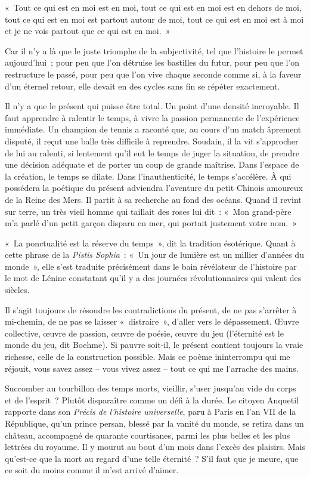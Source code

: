 \documentclass[french,twoside]{book} %
\newenvironment{quoteblock}%
  {\begin{quoting}}
  {\end{quoting}}
\newenvironment{quotebar}{%
    \def\FrameCommand{{\color{rubric!10!}\vrule width 0.5em} \hspace{0.9em}}%
    \def\OuterFrameSep{\itemsep} %
    \MakeFramed {\advance\hsize-\width \FrameRestore}
  }%
  {%
    \endMakeFramed
  }
\renewenvironment{quoteblock}%
  {%
    \savenotes
    \setstretch{0.9}
    \normalfont
    \begin{quotebar}
  }
  {%
    \end{quotebar}
    \spewnotes
  }
\begin{document}
\begin{quoteblock}
\noindent « Tout ce qui est en moi est en moi, tout ce qui est en moi est en dehors de moi, tout ce qui est en moi est partout autour de moi, tout ce qui est en moi est à moi et je ne vois partout que ce qui est en moi. »\end{quoteblock}

\noindent  Car il n’y a là que le juste triomphe de la subjectivité, tel que l’histoire le permet aujourd’hui ; pour peu que l’on détruise les bastilles du futur, pour peu que l’on restructure le passé, pour peu que l’on vive chaque seconde comme si, à la faveur d’un éternel retour, elle devait en des cycles sans fin se répéter exactement.\par
Il n’y a que le présent qui puisse être total. Un point d’une densité incroyable. Il faut apprendre à ralentir le temps, à vivre la passion permanente de l’expérience immédiate. Un champion de tennis a raconté que, au cours d’un match âprement disputé, il reçut une balle très difficile à reprendre. Soudain, il la vit s’approcher de lui au ralenti, si lentement qu’il eut le temps de juger la situation, de prendre une décision adéquate et de porter un coup de grande maîtrise. Dans l’espace de la création, le temps se dilate. Dans l’inauthenticité, le temps s’accélère. À qui possédera la poétique du présent adviendra l’aventure du petit Chinois amoureux de la Reine des Mers. Il partit à sa recherche au fond des océans. Quand il revint sur terre, un très vieil homme qui taillait des roses lui dit : « Mon grand-père m’a parlé d’un petit garçon disparu en mer, qui portait justement votre nom. »\par
« La ponctualité est la réserve du temps », dit la tradition ésotérique. Quant à cette phrase de la \emph{Pistis Sophia} : « Un jour de lumière est un millier d’années du monde », elle s’est traduite précisément dans le bain révélateur de l’histoire par le mot de Lénine constatant qu’il y a des journées révolutionnaires qui valent des siècles.\par
Il s’agit toujours de résoudre les contradictions du présent, de ne pas s’arrêter à mi-chemin, de ne pas se laisser « distraire », d’aller vers le dépassement. Œuvre collective, œuvre de passion, œuvre de poésie, œuvre du jeu (l’éternité est le monde du jeu, dit Boehme). Si pauvre soit-il, le présent contient toujours la vraie richesse, celle de la construction possible. Mais ce poème ininterrompu qui me réjouit, vous savez assez – vous vivez assez – tout ce qui me l’arrache des mains.\par
Succomber au tourbillon des temps morts, vieillir, s’user jusqu’au vide du corps et de l’esprit ? Plutôt disparaître comme un défi à la durée. Le citoyen Anquetil rapporte dans son \emph{Précis de l’histoire universelle}, paru à Paris en l’an VII de la République, qu’un prince persan, blessé par la vanité du monde, se retira dans un château, accompagné de quarante courtisanes, parmi les plus belles et les plus lettrées du royaume. Il y mourut au bout d’un mois dans l’excès des plaisirs. Mais qu’est-ce que la mort au regard d’une telle éternité ? S’il faut que je meure, que ce soit du moins comme il m’est arrivé d’aimer.
\end{document}
